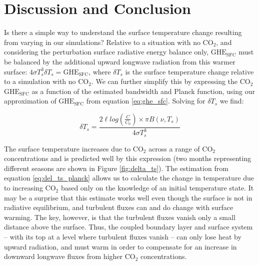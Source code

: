 \documentclass[draft]{agujournal2019}
\begin{document}
\section{Discussion and Conclusion}\label{section:discussion} 
%

Is there a simple way to understand the surface temperature change resulting from varying  in our simulations? Relative to a situation with no CO$_2$, and considering the perturbation surface radiative energy balance only, $\text{GHE}_\text{{SFC}}$ must be balanced by the additional upward longwave radiation from this warmer surface: $ 4 \sigma T_s^3 \delta T_s = \text{GHE}_{\text{SFC}}$, where $\delta T_s$ is the surface temperature change relative to a simulation with no CO$_2$. We can further simplify this by expressing the CO$_2$ $\text{GHE}_\text{{SFC}}$ as a function of the estimated bandwidth and Planck function, using our approximation of $\text{GHE}_\text{{SFC}}$ from equation \ref{eq:ghe_sfc}. Solving for $\delta T_s$ we find:

\begin{equation}\label{eq:del_ts_planck}
    \delta T_s = \frac{2\ell log(\frac{C}{C_0}) \times \pi B(\nu, T_s)}{4\sigma T_s^3}
\end{equation}

The surface temperature increases due to CO$_2$ across a range of CO$_2$ concentrations and is predicted well by this expression (two months representing different seasons are shown in Figure \ref{fig:delta_ts}). The estimation from equation \ref{eq:del_ts_planck} allows us to calculate the change in temperature due to increasing CO$_2$ based only on the knowledge of an initial temperature state. It may be a surprise that this estimate works well even though the surface is not in radiative equilibrium, and turbulent fluxes can and do change with surface warming. The key, however, is that the turbulent fluxes vanish only a small distance above the surface. Thus, the coupled boundary layer and surface system -- with its top at a level where turbulent fluxes vanish -- can only lose heat by upward radiation, and must warm in order to compensate for an increase in downward longwave fluxes from higher CO$_2$ concentrations.  
\end{document}
